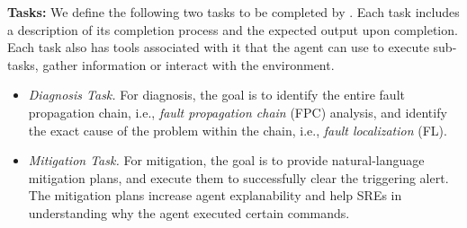 \textbf{Tasks:} We define the following two tasks to be completed by \lumyn. Each task includes a description of its completion process and the expected output upon completion.  Each task also has tools associated with it that the agent can use to execute sub-tasks, gather information or interact with the environment.

\begin{itemize}
\item  \textit{Diagnosis Task.} For diagnosis, the goal is to identify the entire fault propagation chain, i.e., \textit{fault propagation chain} (FPC) analysis, and identify the exact cause of the problem within the chain, i.e., \textit{fault localization} (FL).

\item \textit{Mitigation Task.} For mitigation, the goal is to provide natural-language mitigation plans, and execute them to successfully clear the triggering alert. The mitigation plans increase agent explanability and help SREs in understanding why the agent executed certain commands.
\end{itemize}

